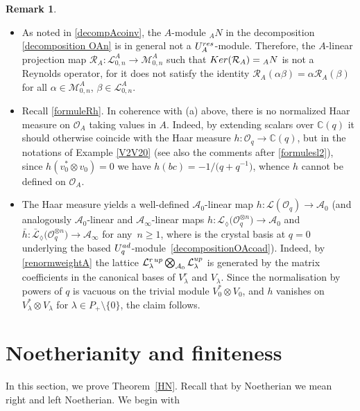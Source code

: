 \documentclass[11pt]{article}
\numberwithin{equation}{section}
\numberwithin{equation}{section}
\theoremstyle{definition}
\newtheorem{Remark}[teo]{Remark}
\newcommand{\mc}{\mathbb{C}}
\newcommand{\Ll}{{\mathcal L}}
\newcommand{\Mm}{{\mathcal M}}
\newcommand{\Oo}{{\mathcal O}}
\newcommand{\Rr}{{\mathcal R}}
\newcommand{\ra}{\rightarrow}
\begin{document}
\begin{Remark}\label{noHaarRoverA}\quad
\begin{itemize}\itemsep=0pt
\item[$(a)$] As noted in \eqref{decompAcoinv}, the $A$-module ${}_AN$ in the decomposition \eqref{decomposition OAn} is in general not a $U_A^{\rm res}$-module. Therefore, the $A$-linear projection map $\Rr_A\colon \Ll_{0,n}^A\ra \Mm_{0,n}^A$ such that ${\rm Ker}(\Rr_A)={}_AN$ is not a Reynolds operator, for it does not satisfy the identity $\Rr_A(\alpha \beta) = \alpha \Rr_A(\beta)$ for all $\alpha\in \Mm_{0,n}^A$, $\beta \in \Ll_{0,n}^A$.

\item[$(b)$] Recall \eqref{formuleRh}. In coherence with (a) above, there is no normalized Haar measure on $\Oo_A$ taking values in $A$. Indeed, by extending scalars over $\mc(q)$ it should otherwise coincide with the Haar measure $h\colon \Oo_q \ra \mc(q)$, but in the notations of Example \ref{V2V20} (see also the comments after \eqref{formulesl2}), since $h(v_0^* \otimes v_0)=0$ we have $h(bc)=-1/\big(q+q^{-1}\big)$, whence $h$ cannot be defined on $\Oo_A$.

\item[$(c)$] The Haar measure yields a well-defined $\mathcal{A}_0$-linear map $h\colon \Ll(\Oo_q) \ra \mathcal{A}_0$ (and analogously $\mathcal{A}_0$-linear and $\mathcal{A}_\infty$-linear maps $h\colon \Ll_{\lozenge}\big(\Oo_q^{\otimes n}\big) \ra \mathcal{A}_0$ and $\bar{h}\colon \bar{\Ll}_{\lozenge}\big(\Oo_q^{\otimes n}\big) \ra \mathcal{A}_\infty$ for any~$n\geq 1$, where \smash{$\big(\Ll_{\lozenge}\big(\Oo_q^{\otimes n}\big),\mathcal{B}[[\lambda]]^*\big)$} is the crystal basis at $q=0$ underlying the based $U_q^{\rm ad}$-module~\eqref{decompositionOAcoad}). Indeed, by \eqref{renormweightA} the lattice $\Ll_{\lambda}^r {}^{\rm up} \bigotimes_{\mathcal{A}_0} \Ll_{\lambda}^{\rm up}$ is generated by the matrix coefficients in the canonical bases of $V_\lambda^r$ and $V_\lambda$. Since the normalisation by powers of $q$ is vacuous on the trivial module $V_0^* \otimes V_0$, and $h$ vanishes on $V_\lambda^* \otimes V_\lambda$ for $\lambda \in P_+\setminus \{0\}$, the claim follows.
 \end{itemize}
\end{Remark}


\setcounter{section}{2}
\section{Noetherianity and finiteness}\label{HNsec}
In this section, we prove Theorem~\ref{HN}. Recall that by Noetherian we mean right and left Noetherian. We begin with
\end{document}
